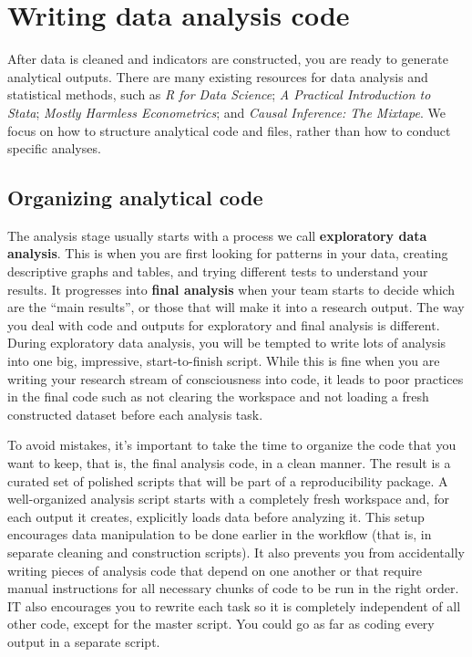
\section{Writing data analysis code}

After data is cleaned and indicators are constructed, you are ready to generate analytical outputs.
There are many existing resources for data analysis and statistical methods, such as
\textit{R for Data Science};\cite{hadley2017R}
\textit{A Practical Introduction to Stata};\cite{RePEc:gdm:wpaper:9412}
\textit{Mostly Harmless Econometrics};\cite{angrist2008mostly}
and \textit{Causal Inference: The Mixtape}.
We focus on how to structure analytical code and files, rather than how to conduct specific analyses.

\subsection{Organizing analytical code}

The analysis stage usually starts with a process we call \textbf{exploratory data analysis}.
This is when you are first looking for patterns in your data,
creating descriptive graphs and tables,
and trying different tests to understand your results.
It progresses into \textbf{final analysis} when your team starts to decide which are the ``main results'', or
those that will make it into a research output.
The way you deal with code and outputs for exploratory and final analysis is different.
During exploratory data analysis,
you will be tempted to write lots of analysis into one big, impressive, start-to-finish script.
While this is fine when you are writing your research stream of consciousness into code, 
it leads to poor practices in the final code such as not clearing the workspace 
and not loading a fresh constructed dataset before each analysis task.

To avoid mistakes, it's important to take the time
to organize the code that you want to keep, that is,
the final analysis code, in a clean manner.
The result is a curated set of polished scripts that will be part of a reproducibility package.
A well-organized analysis script starts with a completely fresh workspace
and, for each output it creates, explicitly loads data before analyzing it.
This setup encourages data manipulation to be done earlier in the workflow
(that is, in separate cleaning and construction scripts).
It also prevents you from accidentally writing pieces of analysis code that depend on one another
or that require manual instructions for all necessary chunks of code to be run in the right order.
IT also encourages you to rewrite each task so it is completely independent of all other code,
except for the master script.
You could go as far as coding every output in a separate script.

